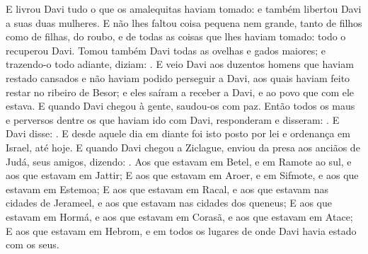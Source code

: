 {  E livrou Davi tudo o que os amalequitas haviam tomado: e também libertou Davi a suas duas mulheres.
  E não lhes faltou coisa pequena nem grande, tanto de filhos como de filhas, do roubo, e de todas as coisas que lhes haviam tomado: todo o recuperou Davi.
  Tomou também Davi todas as ovelhas e gados maiores; e trazendo-o todo adiante, diziam: .
  E veio Davi aos duzentos homens que haviam restado cansados e não haviam podido perseguir a Davi, aos quais haviam feito restar no ribeiro de Besor; e eles saíram a receber a Davi, e ao povo que com ele estava. E quando Davi chegou à gente, saudou-os com paz.
  Então todos os maus e perversos dentre os que haviam ido com Davi, responderam e disseram: .
  E Davi disse: .
  E desde aquele dia em diante foi isto posto por lei e ordenança em Israel, até hoje.
  E quando Davi chegou a Ziclague, enviou da presa aos anciãos de Judá, seus amigos, dizendo: .
  Aos que estavam em Betel, e em Ramote ao sul, e aos que estavam em Jattir;
  E aos que estavam em Aroer, e em Sifmote, e aos que estavam em Estemoa;
  E aos que estavam em Racal, e aos que estavam nas cidades de Jerameel, e aos que estavam nas cidades dos queneus;
  E aos que estavam em Hormá, e aos que estavam em Corasã, e aos que estavam em Atace;
  E aos que estavam em Hebrom, e em todos os lugares de onde Davi havia estado com os seus.
\par }


